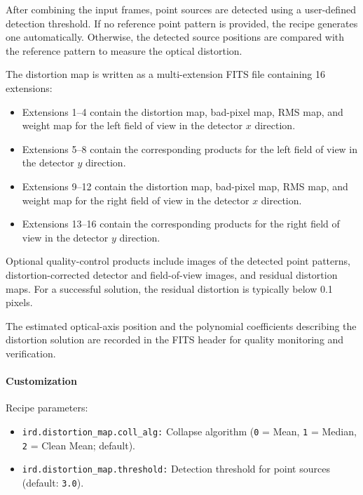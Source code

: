 After combining the input frames, point sources are detected using a
user-defined detection threshold. If no reference point pattern is provided,
the recipe generates one automatically. Otherwise, the detected source
positions are compared with the reference pattern to measure the optical
distortion.

The distortion map is written as a multi-extension FITS file containing
16 extensions:

\begin{itemize}

\item Extensions 1--4 contain the distortion map, bad-pixel map, RMS map,
and weight map for the left field of view in the detector
$x$ direction.

\item Extensions 5--8 contain the corresponding products for the left field
of view in the detector $y$ direction.

\item Extensions 9--12 contain the distortion map, bad-pixel map, RMS map,
and weight map for the right field of view in the detector
$x$ direction.

\item Extensions 13--16 contain the corresponding products for the right field
of view in the detector $y$ direction.

\end{itemize}

Optional quality-control products include images of the detected point
patterns, distortion-corrected detector and field-of-view images, and residual
distortion maps. For a successful solution, the residual distortion is
typically below 0.1 pixels.

The estimated optical-axis position and the polynomial coefficients describing
the distortion solution are recorded in the FITS header for quality monitoring
and verification.

\paragraph{Customization}

Recipe parameters:

\begin{itemize}

\item \texttt{ird.distortion\_map.coll\_alg:} 
Collapse algorithm
(\texttt{0} = Mean,
 \texttt{1} = Median,
 \texttt{2} = Clean Mean; default).

\item \texttt{ird.distortion\_map.threshold:} 
Detection threshold for point sources (default: \texttt{3.0}).

\end{itemize}


